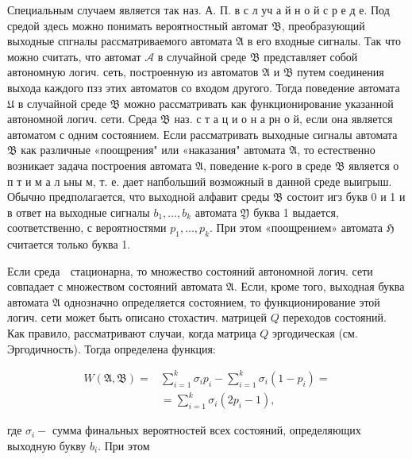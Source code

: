 \documentclass[10pt]{article}
\begin{document}
Специальным случаем является так наз. А. П. в с л уч а й н о й с р е д е. Под средой здесь можно понимать вероятностный автомат $\mathfrak{B}$, преобразующий выходные спгналы рассматриваемого автомата $\mathfrak{A}$ в его входные сигналы. Так что можно считать, что автомат $\mathfrak{\mathcal { A }}$ в случайной среде $\mathfrak{B}$ представляет собой автономную логич. сеть, построенную из автоматов $\mathfrak{A}$ и $\mathfrak{B}$ путем соединения выхода каждого пзз этих автоматов со входом другого. Тогда поведение автомата $\mathfrak{U}$ в случайной среде $\mathfrak{B}$ можно рассматривать как функционирование указанной автономной логич. сети. Среда $\mathfrak{B}$ наз. с т а ц и о н а рн о й, если она является автоматом с одним состоянием. Если рассматривать выходные сигналы автомата $\mathfrak{B}$ как различные «поощрения" или «наказания" автомата $\mathfrak{A}$, то естественно возникает задача построения автомата $\mathfrak{A}$, поведение к-рого в среде $\mathfrak{B}$ является о п т и м а л ьны м, т. е. дает напбольший возможный в данной среде выигрыш. Обычно предполагается, что выходной алфавит среды $\mathfrak{B}$ состоит игз букв 0 и 1 и в ответ на выходные сигналы $b_{1}, \ldots, b_{k}$ автомата $\mathfrak{Y}$ буква 1 выдается, соответственно, с вероятностями $p_{1}, \ldots, p_{k}$. При этом «поощрением» автомата $\mathfrak{H}$ считается только буква 1.



Если среда গ゙ стационарна, то множество состояний автономной логич. сети совпадает с множеством состояний автомата $\mathfrak{A}$. Если, кроме того, выходная буква автомата $\mathfrak{A}$ однозначно определяется состоянием, то функционирование этой логич. сети может быть описано стохастич. матрицей $Q$ переходов состояний. Как правило, рассматривают случаи, когда матрица $Q$ эргодическая (см. Эргодичность). Тогда определена функция:



\[

\begin{aligned}

W(\mathfrak{A}, \mathfrak{B})= & \sum_{i=1}^{k} \sigma_{i} p_{i}-\sum_{i=1}^{k} \sigma_{i}\left(1-p_{i}\right)= \\

& =\sum_{i=1}^{k} \sigma_{i}\left(2 p_{i}-1\right),

\end{aligned}

\]



где $\sigma_{i}-$ сумма финальных вероятностей всех состояний, определяющих выходную букву $b_{i}$. При этом
\end{document}
